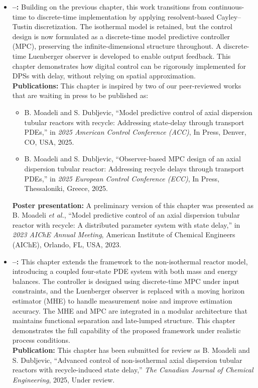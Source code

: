 \begin{itemize}
    \item \textbf{--:} Building on the previous chapter, this work transitions from continuous-time to discrete-time implementation by applying resolvent-based Cayley–Tustin discretization. The isothermal model is retained, but the control design is now formulated as a discrete-time model predictive controller (MPC), preserving the infinite-dimensional structure throughout. A discrete-time Luenberger observer is developed to enable output feedback. This chapter demonstrates how digital control can be rigorously implemented for DPSs with delay, without relying on spatial approximation.\\
    \textbf{Publications:} This chapter is inspired by two of our peer-reviewed works that are waiting in press to be published as:
    \begin{itemize}
        \item {
        B. Moadeli and S. Dubljevic, “Model predictive control of axial dispersion tubular reactors with recycle: Addressing state-delay through transport PDEs,” in \emph{2025 American Control Conference (ACC)}, In Press, Denver, CO, USA, 2025.
        }
        \item {
        B. Moadeli and S. Dubljevic, “Observer-based MPC design of an axial dispersion tubular reactor: Addressing recycle delays through transport PDEs,” in \emph{2025 European Control Conference (ECC)}, In Press, Thessaloniki, Greece, 2025.
        }
    \end{itemize}
    \textbf{Poster presentation:} A preliminary version of this chapter was presented as {
        B. Moadeli \emph{et al.}, “Model predictive control of an axial dispersion tubular reactor with recycle: A distributed parameter system with state delay,” in \emph{2023 AIChE Annual Meeting}, American Institute of Chemical Engineers (AIChE), Orlando, FL, USA, 2023.
    }


    \item \textbf{--:} This chapter extends the framework to the non-isothermal reactor model, introducing a coupled four-state PDE system with both mass and energy balances. The controller is designed using discrete-time MPC under input constraints, and the Luenberger observer is replaced with a moving horizon estimator (MHE) to handle measurement noise and improve estimation accuracy. The MHE and MPC are integrated in a modular architecture that maintains functional separation and late-lumped structure. This chapter demonstrates the full capability of the proposed framework under realistic process conditions.\\
    \textbf{Publication:} This chapter has been submitted for review as {
        B. Moadeli and S. Dubljevic, “Advanced control of non-isothermal axial dispersion tubular reactors with recycle-induced state delay,” \emph{The Canadian Journal of Chemical Engineering}, 2025, Under review.
    }


\end{itemize}
